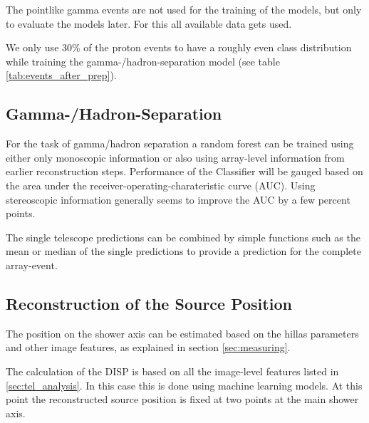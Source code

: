 The pointlike gamma events are not used for the training of the models,
but only to evaluate the models later.
For this all available data gets used.

We only use 30\% of the proton events to have a roughly even class distribution while training 
the gamma-/hadron-separation model (see table \ref{tab:events_after_prep}).



\subsection{Gamma-/Hadron-Separation}
For the task of gamma/hadron separation a random forest can be trained
using either only monoscopic information or also using array-level
information from earlier reconstruction steps.
Performance of the Classifier will be gauged based 
on the area under the receiver-operating-charateristic curve (AUC).
Using stereoscopic information
generally seems to improve the AUC by a few percent points.

The single telescope predictions can be combined by
simple functions such as the mean or median of the
single predictions to provide a prediction for the complete
array-event.





\subsection{Reconstruction of the Source Position}
\label{sec:source_position}

The position on the shower axis can be estimated based on 
the hillas parameters and other image features, as 
explained in section \ref{sec:measuring}.

The calculation of the DISP is based on all the image-level
features listed in \ref{sec:tel_analysis}.
In this case this is done using machine learning models.
At this point the reconstructed source position
is fixed at two points at the main shower axis.

